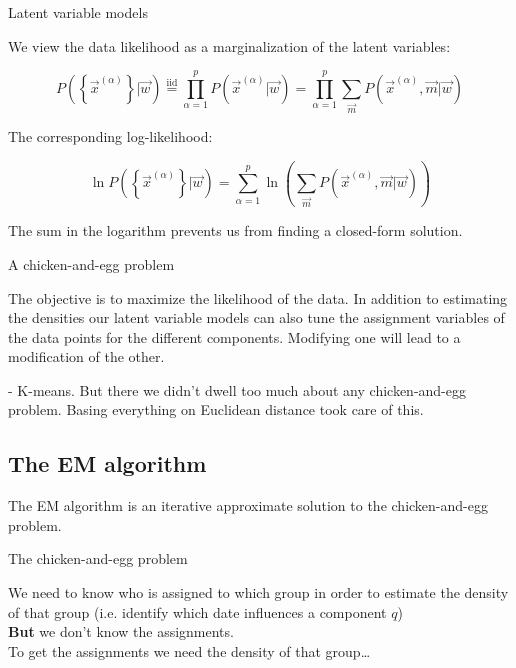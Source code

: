 \begin{frame}{Latent variable models}

We view the data likelihood as a marginalization of the latent variables:

\begin{equation}
P \left( \left\{ \vec{x}^{(\alpha)} \right\} | \vec{w} \right) \stackrel{\text{iid}}{=} \prod_{\alpha=1}^{p} P \left( \vec{x}^{(\alpha)} | \vec{w} \right) = \prod_{\alpha=1}^{p}  \sum_{\vec{m}} P \left( \vec{x}^{(\alpha)}, \vec{m} | \vec{w} \right)
\end{equation}

The corresponding log-likelihood:

\begin{equation}
\ln P \left( \left\{ \vec{x}^{(\alpha)} \right\} | \vec{w} \right) = \sum_{\alpha=1}^{p}  \ln \left( \sum_{\vec{m}} P \left( \vec{x}^{(\alpha)}, \vec{m} | \vec{w} \right) \right)
\end{equation}

The sum in the logarithm prevents us from finding a closed-form solution.

\end{frame}

\begin{frame}{A chicken-and-egg problem}

The objective is to maximize the likelihood of the data. In addition to estimating the densities our latent variable models can also tune the assignment variables of the data points for the different components.
Modifying one will lead to a modification of the other.

\pause


- K-means. But there we didn't dwell too much about any chicken-and-egg problem. Basing everything on Euclidean distance took care of this.


\end{frame}

\subsection{The EM algorithm}

\begin{frame}{\subsecname}

The EM algorithm is an iterative approximate solution to the chicken-and-egg problem.

\begin{block}{The chicken-and-egg problem}

We need to know who is assigned to which group in order to estimate the density of that group (i.e. identify which date influences a component $q$)\\
\textbf{But} we don't know the assignments.\\
To get the assignments we need the density of that group\ldots

\end{block}

\end{frame}

